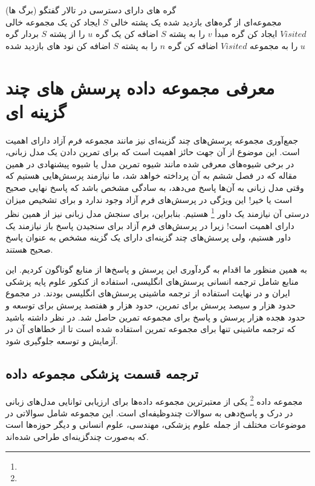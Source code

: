 \begin{algorithm}[ht]
	\onehalfspacing
	\caption{
		الگوریتم جستجو اول عرض برای استخراج رکورد های پرسش و پاسخ پزشکی
	} \label{alg:BFS}
	\begin{algorithmic}[1]
		\REQUIRE گره های دارای دسترسی در تالار گفتگو (برگ ها)		
		\\
		\ENSURE مجموعه‌ای از گره‌های بازدید شده
		\STATE یک پشته خالی $S$ ایجاد کن
		\STATE یک مجموعه خالی $Visited$ ایجاد کن
		\STATE گره مبدأ $v$ را به پشته $S$ اضافه کن
		\STATE یک گره $u$ را از پشته $S$ بردار
		\STATE گره $u$ را به مجموعه $Visited$ اضافه کن
		\STATE گره $n$ را به پشته $S$ اضافه کن
		\ENDIF
		\ENDFOR
		\ENDIF
		\ENDWHILE
		\RETURN نود های بازدید شده
		
	\end{algorithmic}
\end{algorithm}

\section{معرفی مجموعه داده پرسش های چند گزینه ای}
جمع‌آوری مجموعه پرسش‌های چند گزینه‌ای نیز مانند مجموعه فرم آزاد دارای اهمیت است. این موضوع از آن جهت حائز اهمیت است که برای تمرین دادن یک مدل زبانی، در برخی شیوه‌های معرفی شده مانند شیوه تمرین مدل
\cite{b32}
یا شیوه پیشنهادی در همین مقاله که در فصل ششم به آن پرداخته خواهد شد، ما نیازمند پرسش‌هایی هستیم که وقتی مدل زبانی به آن‌ها پاسخ می‌دهد، به سادگی مشخص باشد که پاسخ نهایی صحیح است یا خیر! این ویژگی در پرسش‌های فرم آزاد وجود ندارد و برای تشخیص میزان درستی آن نیازمند یک داور
\footnote{}
هستیم. بنابراین، برای سنجش مدل زبانی نیز از همین نظر دارای اهمیت است! زیرا در پرسش‌های فرم آزاد برای سنجیدن پاسخ باز نیازمند یک داور هستیم، ولی پرسش‌های چند گزینه‌ای دارای یک گزینه مشخص به عنوان پاسخ صحیح هستند.

به همین منظور ما اقدام به گردآوری این پرسش و پاسخ‌ها از منابع گوناگون کردیم. این منابع شامل ترجمه انسانی پرسش‌های انگلیسی، استفاده از کنکور علوم پایه پزشکی ایران و در نهایت استفاده از ترجمه ماشینی پرسش‌های انگلیسی بودند. در مجموع حدود هزار و سیصد پرسش برای تمرین، حدود هزار و هفتصد پرسش برای توسعه و حدود هجده هزار پرسش و پاسخ برای مجموعه تمرین حاصل شد. در نظر داشته باشید که ترجمه ماشینی تنها برای مجموعه تمرین استفاده شده است تا از خطاهای آن در آزمایش و توسعه جلوگیری شود.

\subsection{ترجمه قسمت پزشکی مجموعه داده
}
مجموعه داده 
\cite{b14}
\footnote{}
یکی از معتبرترین مجموعه داده‌ها برای ارزیابی توانایی مدل‌های زبانی در درک و پاسخ‌دهی به سوالات چندوظیفه‌ای است. این مجموعه شامل سوالاتی در موضوعات مختلف از جمله علوم پزشکی، مهندسی، علوم انسانی و دیگر حوزه‌ها است که به‌صورت چندگزینه‌ای طراحی شده‌اند.


